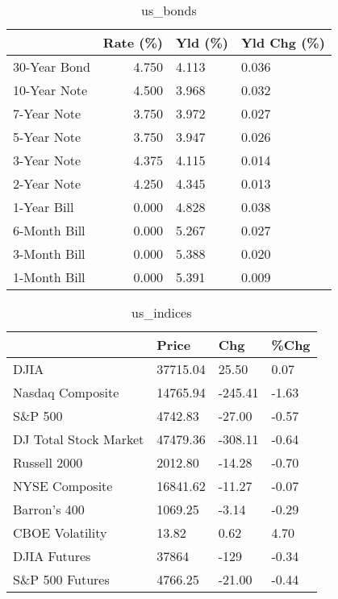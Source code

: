 \documentclass{article}%
\begin{document}
\begin{table}[htbp]%
\caption{us\_bonds}%
\centering%
\begin{adjustbox}{width=1\textwidth}%
\begin{tabular}{lrll}
\toprule
             &  Rate (\%) & Yld (\%) & Yld Chg (\%) \\
\midrule
30-Year Bond &     4.750 &   4.113 &       0.036 \\
10-Year Note &     4.500 &   3.968 &       0.032 \\
 7-Year Note &     3.750 &   3.972 &       0.027 \\
 5-Year Note &     3.750 &   3.947 &       0.026 \\
 3-Year Note &     4.375 &   4.115 &       0.014 \\
 2-Year Note &     4.250 &   4.345 &       0.013 \\
 1-Year Bill &     0.000 &   4.828 &       0.038 \\
6-Month Bill &     0.000 &   5.267 &       0.027 \\
3-Month Bill &     0.000 &   5.388 &       0.020 \\
1-Month Bill &     0.000 &   5.391 &       0.009 \\
\bottomrule
\end{tabular}
%
\end{adjustbox}%
\end{table}

%


\begin{table}[htbp]%
\caption{us\_indices}%
\centering%
\begin{adjustbox}{width=1\textwidth}%
\begin{tabular}{llll}
\toprule
                      &    Price &     Chg &  \%Chg \\
\midrule
                 DJIA & 37715.04 &   25.50 &  0.07 \\
     Nasdaq Composite & 14765.94 & -245.41 & -1.63 \\
              S\&P 500 &  4742.83 &  -27.00 & -0.57 \\
DJ Total Stock Market & 47479.36 & -308.11 & -0.64 \\
         Russell 2000 &  2012.80 &  -14.28 & -0.70 \\
       NYSE Composite & 16841.62 &  -11.27 & -0.07 \\
         Barron's 400 &  1069.25 &   -3.14 & -0.29 \\
      CBOE Volatility &    13.82 &    0.62 &  4.70 \\
         DJIA Futures &    37864 &    -129 & -0.34 \\
      S\&P 500 Futures &  4766.25 &  -21.00 & -0.44 \\
\bottomrule
\end{tabular}
%
\end{adjustbox}%
\end{table}
\end{document}
